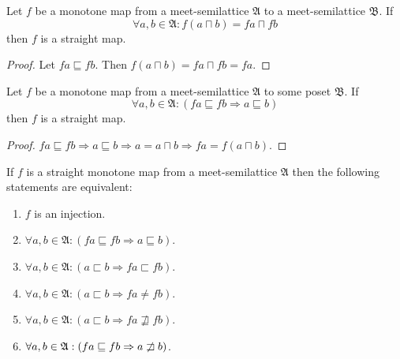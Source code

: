 \begin{prop}
Let $f$ be a monotone map from a meet-semilattice $\mathfrak{A}$
to a meet-semilattice $\mathfrak{B}$. If
\[
\forall a,b\in\mathfrak{A}:f(a\sqcap b)=fa\sqcap fb
\]
then $f$ is a straight map.\end{prop}
\begin{proof}
Let $fa\sqsubseteq fb$. Then $f(a\sqcap b)=fa\sqcap fb=fa$.\end{proof}
\begin{prop}
Let $f$ be a monotone map from a meet-semilattice $\mathfrak{A}$
to some poset $\mathfrak{B}$. If
\[
\forall a,b\in\mathfrak{A}:(fa\sqsubseteq fb\Rightarrow a\sqsubseteq b)
\]
then $f$ is a straight map.\end{prop}
\begin{proof}
$fa\sqsubseteq fb\Rightarrow a\sqsubseteq b\Rightarrow a=a\sqcap b\Rightarrow fa=f(a\sqcap b)$.\end{proof}
\begin{thm}
If $f$ is a straight monotone map from a meet-semilattice $\mathfrak{A}$
then the following statements are equivalent:
\begin{enumerate}
\item \label{stra-inj}$f$ is an injection.
\item \label{stra-sqe-sqe}$\forall a,b\in\mathfrak{A}:(fa\sqsubseteq fb\Rightarrow a\sqsubseteq b)$.
\item \label{stra-sq-sq}$\forall a,b\in\mathfrak{A}:(a\sqsubset b\Rightarrow fa\sqsubset fb)$.
\item \label{stra-sq-ne}$\forall a,b\in\mathfrak{A}:(a\sqsubset b\Rightarrow fa\neq fb)$.
\item \label{stra-sq-nsqe}$\forall a,b\in\mathfrak{A}:(a\sqsubset b\Rightarrow fa\nsqsupseteq fb)$.
\item \label{stra-sqe-nsq}$\forall a,b\in\mathfrak{A}:(fa\sqsubseteq fb\Rightarrow a\not\sqsupset b)$.
\end{enumerate}
\end{thm}
